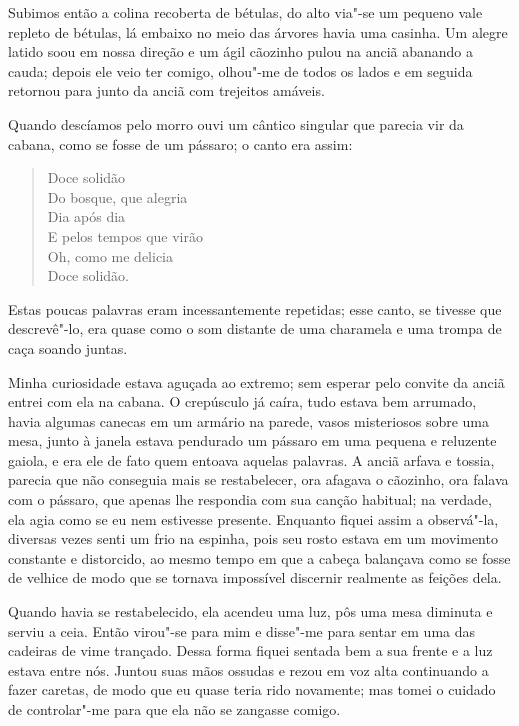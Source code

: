 Subimos então a colina recoberta de bétulas, do alto via"-se um pequeno
vale repleto de bétulas, lá embaixo no meio das árvores havia uma
casinha. Um alegre latido soou em nossa direção e um ágil
cãozinho pulou na anciã abanando a cauda; depois ele veio ter comigo,
olhou"-me de todos os lados e em seguida retornou para junto da anciã
com trejeitos amáveis.

Quando descíamos pelo morro ouvi um cântico singular que parecia vir da
cabana, como se fosse de um pássaro; o canto era assim:

\begin{verse}
Doce solidão\\
Do bosque, que alegria\\
Dia após dia\\
E pelos tempos que virão\\
Oh, como me delicia\\
Doce solidão.
\end{verse}

 Estas poucas palavras eram incessantemente repetidas; esse canto, se
tivesse que descrevê"-lo, era quase como o som distante de uma charamela
e uma trompa de caça soando juntas.

 Minha curiosidade estava aguçada ao extremo; sem esperar pelo convite
da anciã entrei com ela na cabana. O crepúsculo já caíra, tudo estava
bem arrumado, havia algumas canecas em um armário na parede, vasos
misteriosos sobre uma mesa, junto à janela estava pendurado um pássaro
em uma pequena e reluzente gaiola, e era ele de fato quem entoava
aquelas palavras. A anciã arfava e tossia, parecia que não conseguia
mais se restabelecer, ora afagava o cãozinho, ora falava com o pássaro,
que apenas lhe respondia com sua canção habitual; na verdade, ela agia
como se eu nem estivesse presente. Enquanto fiquei assim a observá"-la,
diversas vezes senti um frio na espinha, pois seu rosto estava em um
movimento constante e distorcido, ao mesmo tempo em que a cabeça
balançava como se fosse de velhice de modo que se tornava impossível
discernir realmente as feições dela.

 Quando havia se restabelecido, ela acendeu uma luz, pôs uma mesa
diminuta e serviu a ceia. Então virou"-se para mim e disse"-me para
sentar em uma das cadeiras de vime trançado. Dessa forma fiquei sentada
bem a sua frente e a luz estava entre nós. Juntou suas mãos ossudas e
rezou em voz alta continuando a fazer caretas, de modo que eu quase
teria rido novamente; mas tomei o cuidado de controlar"-me para que ela
não se zangasse comigo.

